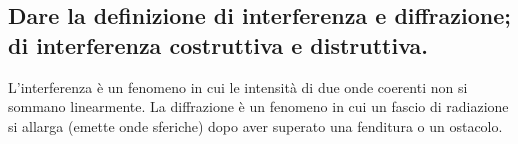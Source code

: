 \subsection[]{ Dare la definizione di interferenza e diffrazione; di interferenza costruttiva e distruttiva.}
L'interferenza è un fenomeno in cui le intensità di due onde coerenti non si sommano linearmente. La diffrazione è un fenomeno in cui un fascio di radiazione si allarga (emette onde sferiche) dopo aver superato una fenditura o un ostacolo.

